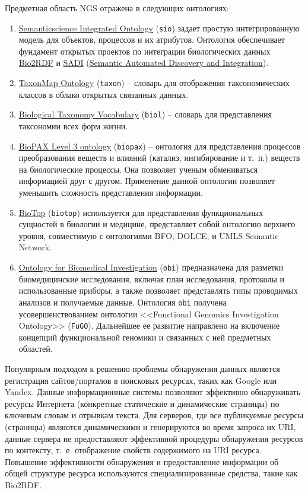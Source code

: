 \documentclass[a4paper,12pt,openany,final]{extreport}
\begin{document}
Предметная область NGS отражена в следующих онтологиях:
\begin{enumerate}
\itemsep=1pt plus 0.3pt minus 0.1pt
\item \href{https://github.com/micheldumontier/semanticscience}{{Semanticscience Integrated Ontology}} (\texttt{sio}) задает простую интегрированную модель для объектов, процессов и их атрибутов. Онтология обеспечивает фундамент открытых проектов по интеграции биологических данных \href{http://bio2rdf.org}{{Bio2RDF}} и \href{http://sadiframework.org}{{SADI}} (\href{http://sadiframework.org/content/about-sadi/}{{Semantic Automated Discovery and Integration}}).
\item \href{http://purl.org/biodiversity/taxon/}{{TaxonMap Ontology}} (\texttt{taxon}) -- словарь для отображения таксономических классов в облако открытых связанных данных.
\item \href{http://purl.org/NET/biol/ns}{{Biological Taxonomy Vocabulary}} (\texttt{biol}) -- словарь для представления таксономии всех форм жизни.
\item \href{http://www.biopax.org/}{{BioPAX Level 3 ontology}} (\texttt{biopax}) -- онтология для представления процессов преобразования веществ и влияний (катализ, ингибирование и т.~п.) веществ на биологические процессы. Она позволяет ученым обмениваться информацией друг с другом. Применение данной онтологии позволяет уменьшить сложность представления информации.
\item \href{http://biotopontology.github.io/}{{BioTop}} (\texttt{biotop}) используется для представления функциональных сущностей в биологии и медицине, представляет собой онтологию верхнего уровня, совместимую с онтологиями BFO, DOLCE, и UMLS Semantic Network.
\item \href{https://raw.githubusercontent.com/obi-ontology/obi/v2017-09-03/obi.owl}{{Ontology for Biomedical Investigation}} (\texttt{obi}) предназначена для разметки биомедицинские исследования, включая план исследования, протоколы и использованные приборы, а также позволяет представлять типы проводимых анализов и получаемые данные. Онтология \texttt{obi} получена усовершенствованием онтологии <<Functional Genomics Investigation Ontology>> (\texttt{FuGO}). Дальнейшее ее развитие направлено на включение концепций функциональной геномики и связанных с ней предметных областей.
\end{enumerate}

Популярным подходом к решению проблемы обнаружения данных является регистрация сайтов/порталов в поисковых ресурсах, таких как Google или Yandex. Данные информационные системы позволяют эффективно обнаруживать ресурсы Интернета (конкретные статические и динамические страницы) по ключевым словам и отрывкам текста. Для серверов, где все публикуемые ресурсы (страницы) являются динамическими и генерируются во время запроса их URI, данные сервера не предоставляют эффективной процедуры обнаружения ресурсов по контексту, т.~е. отображение свойств содержимого на URI ресурса. Повышение эффективности обнаружения и предоставление информации об общей структуре ресурса используются специализированные средства, такие как Bio2RDF.
\end{document}
